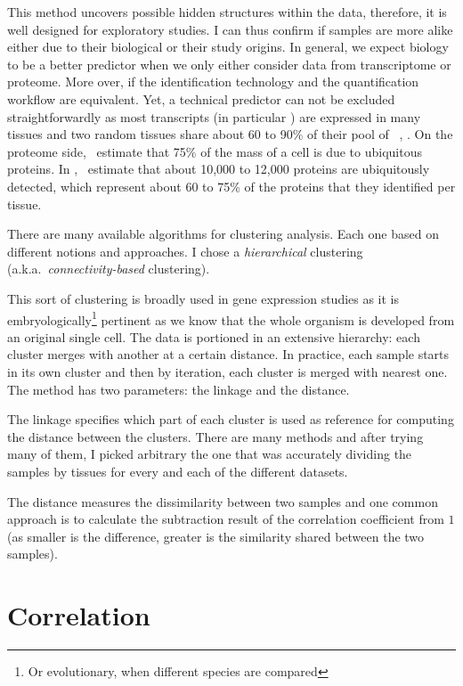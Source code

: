 This method uncovers possible hidden structures within the data, therefore,
it is well designed for exploratory studies.
I can thus confirm if samples are more alike either due to their
biological or their study origins. In general, we expect biology to be a better
predictor when we only either consider data from transcriptome or proteome.
More over, if the identification technology and the quantification workflow are
equivalent. Yet, a technical predictor can not be excluded straightforwardly
as most transcripts (in particular \mRNAs) are expressed in many tissues
and two random tissues share about 60 to 90\% of their pool of
\mRNAs~\citep{ramskoldan:2009}, \citep{UhlenGastro}.
On the proteome side,~\cite{PandeyData}
estimate that 75\% of the mass of a cell is due to ubiquitous proteins.
In ,~\cite{KusterData} estimate that about 10,000
to 12,000 proteins are ubiquitously detected, which represent about 60 to 75\%
of the proteins that they identified per tissue.

There are many available algorithms for clustering analysis.
Each one based on different notions and approaches.
I chose a \emph{hierarchical} clustering (a.k.a.\ \emph{connectivity-based}
clustering).

This sort of clustering is broadly used in gene expression studies as it is
embryologically\footnote{Or evolutionary, when different species are compared}
pertinent as we know that the whole organism is developed from
an original single cell. The data is portioned in an extensive hierarchy:
each cluster merges with another at a certain distance.
In practice, each sample starts in its own cluster and then
by iteration, each cluster is merged with nearest one. The method has
two parameters: the linkage and the distance.

The linkage specifies which part of each cluster is used as reference
for computing the distance between the clusters. There are many methods and after
trying many of them, I picked arbitrary the one that was accurately dividing
the samples by tissues for every and each of the different datasets.

The distance measures the dissimilarity between two samples and one common
approach is to calculate the subtraction result of
the correlation coefficient from $1$ (as smaller is the difference, greater is
the similarity shared between the two samples).

\section{Correlation}

